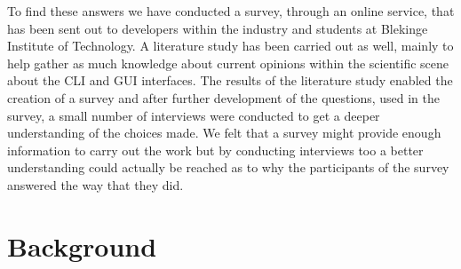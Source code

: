 \documentclass[a4paper,oneside]{bth} %
\begin{document}
		To find these answers we have conducted a survey, through an online service, that has been sent out to developers within the industry and students at Blekinge Institute of Technology.
		A literature study has been carried out as well, mainly to help  gather as much knowledge about current opinions within the scientific scene about the CLI and GUI interfaces.
		The results of the literature study enabled the creation of a  survey and after further development of the questions, used in the survey, a small number of interviews were conducted to get a deeper understanding of the choices made.
		We felt that a survey might provide enough information to carry out the work but by conducting interviews too a better understanding could actually be reached as to why the participants of the survey answered the way that they did.
		
		\chapter{Background}
\end{document}
